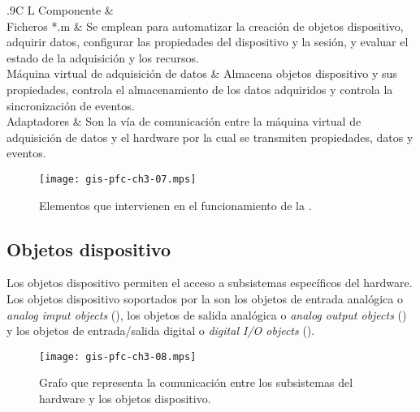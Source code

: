\begin{table}
	\centering
	\begin{tabulary}{.9\textwidth}{C L}
		\toprule
		Componente &  \\
		\midrule
		Ficheros *.m & Se emplean para automatizar la creación de
		objetos dispositivo, adquirir datos, configurar las
		propiedades del dispositivo y la sesión, y evaluar el
		estado de la adquisición y los recursos.\\
		\midrule
		Máquina virtual de adquisición de datos & Almacena objetos
		dispositivo y sus propiedades, controla el almacenamiento
		de los datos adquiridos y controla la sincronización de
		eventos.\\
		\midrule
		Adaptadores & Son la vía de comunicación entre la máquina
		virtual de adquisición de datos y el hardware por la cual
		se transmiten propiedades, datos y eventos.\\
		\bottomrule
	\end{tabulary}
	\caption[Descripción de los componentes de la \datx{}] {Descripción
	de los componentes de la \datx{}.}
	\label{tab:toolcomp}
\end{table}

\begin{figure}
	\begin{center}
		\texttt{[image: gis-pfc-ch3-07.mps]}
	\end{center}
	\caption[Elementos que intervienen en el funcionamiento de la
	\datx{}]{Elementos que intervienen en el funcionamiento de la
	\datx{}.}
	\label{fig:toolcomp}
\end{figure}

\subsection{Objetos dispositivo}

Los objetos dispositivo permiten el acceso a subsistemas específicos del
hardware. Los objetos dispositivo soportados por la \datx{} son los objetos
de entrada analógica o \emph{analog imput objects} (), los objetos
de salida analógica o \emph{analog output objects} () y los
objetos de entrada/salida digital o \emph{digital I/O objects}
().

\begin{figure}
	\begin{center}
		\texttt{[image: gis-pfc-ch3-08.mps]}
	\end{center}
	\caption[Comunicación entre los subsistemas del hardware y los
	objetos dispositivo]{Grafo que representa la comunicación entre los
	subsistemas del hardware y los objetos dispositivo.}
	\label{fig:subsystemsOO}
\end{figure}


